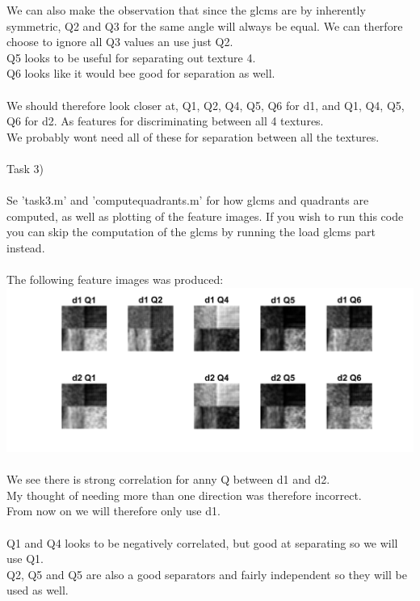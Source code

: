 \documentclass[12pt, letterpaper, twoside]{article}
\begin{document}
We can also make the observation that since the glcms are by inherently symmetric, Q2 and Q3 for the same angle will always be equal. We can therfore choose to ignore all Q3 values an use just Q2.\\
Q5 looks to be useful for separating out texture 4.\\
Q6 looks like it would bee good for separation as well.\\
\ \\
We should therefore look closer at, Q1, Q2, Q4, Q5, Q6 for d1, and Q1, Q4, Q5, Q6 for d2. As features for discriminating between all 4 textures.\\
We probably wont need all of these for separation between all the textures.
\ \\
\ \\
Task 3)\\
\ \\
Se 'task3.m' and 'computequadrants.m' for how glcms and quadrants are computed, as well as plotting of the feature images. If you wish to run this code you can skip the computation of the glcms by running the load glcms part instead.\\
\ \\
The following feature images was produced:\\
\includegraphics[scale=0.47]{"task3_quadrants.png"}\\
\newpage
\ \\
We see there is strong correlation for anny Q between d1 and d2.\\
My thought of needing more than one direction was therefore incorrect.\\
From now on we will therefore only use d1.\\
\ \\
Q1 and Q4 looks to be negatively correlated, but good at separating so we will use Q1.\\
Q2, Q5 and Q5 are also a good separators and fairly independent so they will be used as well.\\
\end{document}
